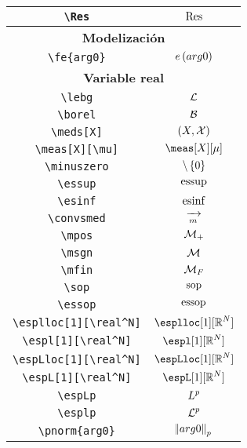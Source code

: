 \begin{longtable}{|c|c|}
\verb|\Res| & $\displaystyle\Res$ \\ \midrule 
\bottomrule \multicolumn{2}{|c|}{\textbf{Modelización}} \\ \toprule 
\verb|\fe{arg0}| & $\displaystyle\fe{arg0}$ \\ \midrule 
\bottomrule \multicolumn{2}{|c|}{\textbf{Variable real}} \\ \toprule 
\verb|\lebg| & $\displaystyle\lebg$ \\ \midrule 
\verb|\borel| & $\displaystyle\borel$ \\ \midrule 
\verb|\meds[X]| & $\displaystyle\meds[X]$ \\ \midrule 
\verb|\meas[X][\mu]| & $\displaystyle\meas[X][\mu]$ \\ \midrule 
\verb|\minuszero| & $\displaystyle\minuszero$ \\ \midrule 
\verb|\essup| & $\displaystyle\essup$ \\ \midrule 
\verb|\esinf| & $\displaystyle\esinf$ \\ \midrule 
\verb|\convsmed| & $\displaystyle\convsmed$ \\ \midrule 
\verb|\mpos| & $\displaystyle\mpos$ \\ \midrule 
\verb|\msgn| & $\displaystyle\msgn$ \\ \midrule 
\verb|\mfin| & $\displaystyle\mfin$ \\ \midrule 
\verb|\sop| & $\displaystyle\sop$ \\ \midrule 
\verb|\essop| & $\displaystyle\essop$ \\ \midrule 
\verb|\esplloc[1][\real^N]| & $\displaystyle\esplloc[1][\real^N]$ \\ \midrule 
\verb|\espl[1][\real^N]| & $\displaystyle\espl[1][\real^N]$ \\ \midrule 
\verb|\espLloc[1][\real^N]| & $\displaystyle\espLloc[1][\real^N]$ \\ \midrule 
\verb|\espL[1][\real^N]| & $\displaystyle\espL[1][\real^N]$ \\ \midrule 
\verb|\espLp| & $\displaystyle\espLp$ \\ \midrule 
\verb|\esplp| & $\displaystyle\esplp$ \\ \midrule 
\verb|\pnorm{arg0}| & $\displaystyle\pnorm{arg0}$ \\ \midrule 
\end{longtable}